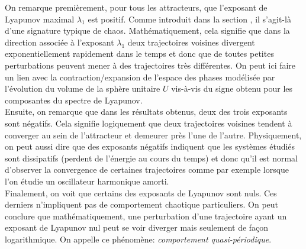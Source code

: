     On remarque premièrement, pour tous les attracteurs, que l'exposant de Lyapunov maximal $\lambda_1$ est positif. Comme introduit dans la section , il s'agit-là d'une signature typique de chaos. Mathématiquement, cela signifie que dans la direction associée à l'exposant $\lambda_1$ deux trajectoires voisines divergent exponentiellement rapidement dans le temps et donc que de toutes petites perturbations peuvent mener à des trajectoires très différentes. On peut ici faire un lien avec la contraction/expansion de l'espace des phases modélisée par l'évolution du volume de la sphère unitaire $U$ vis-à-vis du signe obtenu pour les composantes du spectre de Lyapunov. \\

    Ensuite, on remarque que dans les résultats obtenus, deux des trois exposants sont négatifs. Cela signifie logiquement que deux trajectoires voisines tendent à converger au sein de l'attracteur et demeurer près l'une de l'autre. Physiquement, on peut aussi dire que des exposants négatifs indiquent que les systèmes étudiés sont dissipatifs (perdent de l'énergie au cours du temps) et donc qu'il est normal d'observer la convergence de certaines trajectoires comme par exemple lorsque l'on étudie un oscillateur harmonique amorti. \\

    Finalement, on voit que certains des exposants de Lyapunov sont nuls. Ces derniers n'impliquent pas de comportement chaotique particuliers. On peut conclure que mathématiquement, une perturbation d'une trajectoire ayant un exposant de Lyapunov nul peut se voir diverger mais seulement de façon logarithmique. On appelle ce phénomène: \textit{comportement quasi-périodique}.

\onecolumngrid
\vspace{2cm}

